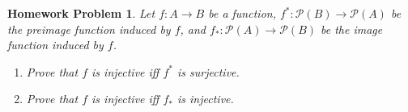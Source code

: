 \documentclass{article}
\newtheorem{hw}{Homework Problem}
\begin{document}
	\begin{hw}
		Let $f:A\rightarrow B$ be a function, $f^*:\mathcal{P}(B) \rightarrow \mathcal{P}(A)$ be the preimage function induced by $f$, and $f_*:\mathcal{P}(A) \rightarrow \mathcal{P}(B)$ be the image function induced by $f$.
		\begin{enumerate}
			\item[$(i)$]  Prove that   $f$ is injective iff $f^*$ is surjective.
			\item[$(ii)$] Prove that   $f$ is injective iff $f_*$ is injective.
		\end{enumerate}
	\end{hw}

	\underline{\hspace{5in}}

\end{document}
